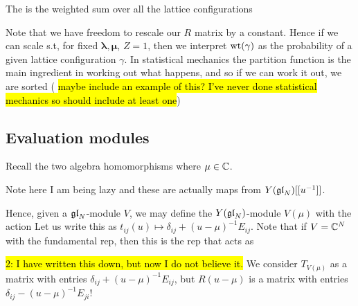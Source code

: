 \documentclass{article}
\begin{document}
\begin{definition}
The  is the weighted sum over all the lattice configurations 
\end{definition}

\begin{remark}
Note that we have freedom to rescale our $R$ matrix by a constant. Hence if we can scale s.t, for fixed $\bm{\lambda},\bm{\mu}$, $Z=1$, then we interpret $\operatorname{wt}(\gamma)$ as the probability of a given lattice configuration $\gamma$. In statistical mechanics the partition function is the main ingredient in working out what happens, and so if we can work it out, we are sorted (\hl{ maybe include an example of this? I've never done statistical mechanics so should include at least one})
\end{remark}

\subsection{Evaluation modules}

Recall the two algebra homomorphisms 
where $\mu \in \mathbb{C}$.

\begin{remark}
Note here I am being lazy and these are actually maps from $Y(\mathfrak{gl}_N)[[u^{-1}]]$. 
\end{remark}

Hence, given a $\mathfrak{gl}_N$-module $V$,  we may define the $Y(\mathfrak{gl}_N)$-module $V(\mu)$ with the action  
Let us write this as $t_{ij}(u) \mapsto \delta_{ij} + (u - \mu)^{-1}E_{ij}$.
Note that if $V = \mathbb{C}^N$ with the fundamental rep, then this is the rep that acts as 

\begin{remark}
\hl{2: I have written this down, but now I do not believe it.} We consider $T_{V(\mu)}$ as a matrix with entries $\delta_{ij} + (u-\mu)^{-1}E_{ij}$, but $R(u-\mu)$ is a matrix with entries $\delta_{ij} - (u-\mu)^{-1}E_{ji}$!
\end{remark}
\end{document}
